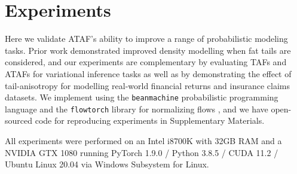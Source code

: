 \documentclass[../../thesis.tex]{subfiles}
\begin{document}


\section{Experiments}
\label{sec:experiments}

Here we validate ATAF's ability to improve
a range of probabilistic modeling tasks.
Prior work \citep{jaini2020tails} demonstrated improved
density modelling when fat tails are considered, and
our experiments are complementary by evaluating TAFs and ATAFs for variational inference tasks as well as by demonstrating the effect of tail-anisotropy for modelling real-world financial returns and insurance claims datasets.
We implement using the
\texttt{beanmachine} probabilistic programming language \citep{tehrani2020bean}
and the
\texttt{flowtorch} library for normalizing flows \citep{flowtorchai},
and we have open-sourced code for reproducing experiments in Supplementary Materials.

All experiments were performed on an Intel i8700K with 32GB RAM and a NVIDIA GTX 1080
running PyTorch 1.9.0 / Python 3.8.5 / CUDA 11.2 / Ubuntu Linux 20.04 via Windows Subsystem for Linux.
\end{document}
